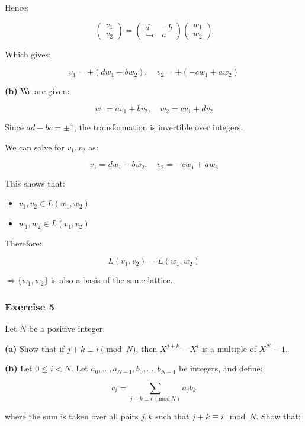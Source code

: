 \documentclass[a4paper,12pt]{article}
\begin{document}
Hence:

\[
\begin{pmatrix}
v_1 \\
v_2
\end{pmatrix}
=
\begin{pmatrix}
d & -b \\
-c & a
\end{pmatrix}
\begin{pmatrix}
w_1 \\
w_2
\end{pmatrix}
\]

Which gives:

\[
v_1 = \pm (d w_1 - b w_2), \quad v_2 = \pm (-c w_1 + a w_2)
\]

\textbf{(b)} We are given:

\[
w_1 = a v_1 + b v_2, \quad w_2 = c v_1 + d v_2
\]

Since \(ad - bc = \pm 1\), the transformation is invertible over
integers.

We can solve for \(v_1, v_2\) as:

\[
v_1 = d w_1 - b w_2, \quad v_2 = -c w_1 + a w_2
\]

This shows that:

\begin{itemize}
\tightlist
\item
  \(v_1, v_2 \in L(w_1, w_2)\)
\item
  \(w_1, w_2 \in L(v_1, v_2)\)
\end{itemize}

Therefore:

\[
L(v_1, v_2) = L(w_1, w_2)
\]

\(\Rightarrow \{w_1, w_2\}\) is also a basis of the same lattice.

    \subsubsection{Exercise 5}\label{exercise-5}

Let \(N\) be a positive integer.

\textbf{(a)} Show that if \(j + k \equiv i \pmod{N}\), then
\(X^{j+k} - X^i\) is a multiple of \(X^N - 1\).

\textbf{(b)} Let \(0 \leq i < N\). Let
\(a_0, \dots, a_{N-1}, b_0, \dots, b_{N-1}\) be integers, and define:

\[
c_i = \sum_{j + k \equiv i \ (\mathrm{mod}\ N)} a_j b_k
\]

where the sum is taken over all pairs \(j, k\) such that
\(j + k \equiv i \mod N\). Show that:
\end{document}

